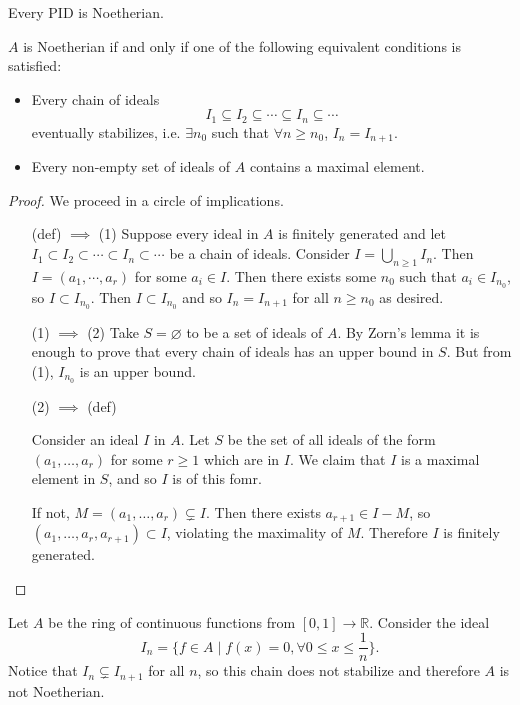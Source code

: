 \begin{xmpl}
Every PID is Noetherian.
\end{xmpl}

\begin{prop}
$A$ is Noetherian if and only if one of the following equivalent
conditions is satisfied:
\begin{itemize}
  \item{
    Every chain of ideals
    $$
    I_1 \subseteq I_2 \subseteq \cdots \subseteq I_n \subseteq \cdots
    $$
    eventually stabilizes, i.e. $\exists n_0$ such that
    $\forall n \geq n_0$, $I_n = I_{n+1}$.
  }
  \item{
    Every non-empty set of ideals of $A$ contains a maximal element.
  }
\end{itemize}
\end{prop}

\begin{proof}
We proceed in a circle of implications.
\begin{itemize}
  \item[(def) $\implies$ (1)]
  {
    Suppose every ideal in $A$ is finitely generated and let
    $I_1 \subset I_2 \subset \cdots \subset I_n \subset \cdots$ be a
    chain of ideals. Consider $I = \bigcup_{n \geq 1} I_n$. Then
    $I = (a_1, \cdots, a_r)$ for some $a_i \in I$. Then there exists
    some $n_0$ such that $a_i \in I_{n_0}$, so $I \subset
    I_{n_0}$. Then $I \subset I_{n_0}$ and so $I_n = I_{n+1}$ for all
    $n \geq n_0$ as desired.
  }
  \item[(1) $\implies$ (2)]
  {
    Take $S = \varnothing$ to be a set of ideals of $A$. By Zorn's
    lemma it is enough to prove that every chain of ideals has an
    upper bound in $S$. But from (1), $I_{n_0}$ is an upper bound.
  }
  \item[(2) $\implies$ (def)]
  {
    Consider an ideal $I$ in $A$. Let $S$ be the set of all ideals
    of the form $(a_1, \dots, a_r)$ for some $r \geq 1$ which are in
    $I$. We claim that $I$ is a maximal element in $S$, and so
    $I$ is of this fomr.

    If not, $M = (a_1, \dots, a_r) \subsetneq I$. Then there exists
    $a_{r+1} \in I - M$, so  $(a_1, \dots, a_r, a_{r+1}) \subset I$,
    violating the maximality of $M$. Therefore $I$ is finitely generated.
  }
\end{itemize}
\end{proof}

\begin{xmpl}
Let $A$ be the ring of continuous functions from $[0,1] \to
\mathbb{R}$. Consider the ideal
$$
I_n = \{ f \in A \mid f(x) = 0, \forall 0 \leq x \leq \frac{1}{n} \}.
$$
Notice that $I_n \subsetneq I_{n+1}$ for all $n$, so this chain does
not stabilize and therefore $A$ is not Noetherian.
\end{xmpl}

